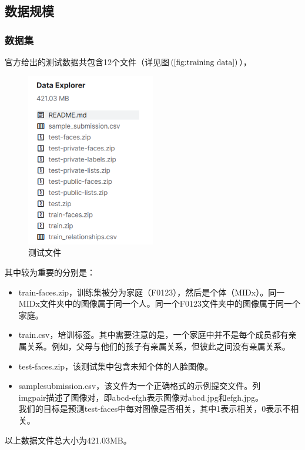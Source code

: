 \documentclass[UTF8]{ctexart}
\begin{document}
\subsection{数据规模}
\subsubsection{数据集}
官方给出的测试数据共包含12个文件（详见图$\left(\ref{fig:training data}\right)$），

\begin{figure}[!ht]
  \centering
  \includegraphics[width=0.5\textwidth]{training data.jpg}
  \caption{测试文件}
  \label{fig:training data}
\end{figure}
其中较为重要的分别是：
\begin{itemize}
  \item train-faces.zip，训练集被分为家庭（F0123），然后是个体（MIDx）。同一MIDx文件夹中的图像属于同一个人。同一个F0123文件夹中的图像属于同一个家庭。
  \item train.csv，培训标签。其中需要注意的是，一个家庭中并不是每个成员都有亲属关系。例如，父母与他们的孩子有亲属关系，但彼此之间没有亲属关系。
  \item test-faces.zip，该测试集中包含未知个体的人脸图像。
  \item sample\underline{\space}submission.csv，该文件为一个正确格式的示例提交文件。列\\
  img\underline{\space}pair描述了图像对，即abcd-efgh表示图像对abcd.jpg和efgh.jpg。\\
  我们的目标是预测test-faces中每对图像是否相关，其中1表示相关，0表示不相关。
\end{itemize}

以上数据文件总大小为421.03MB。
\end{document}

